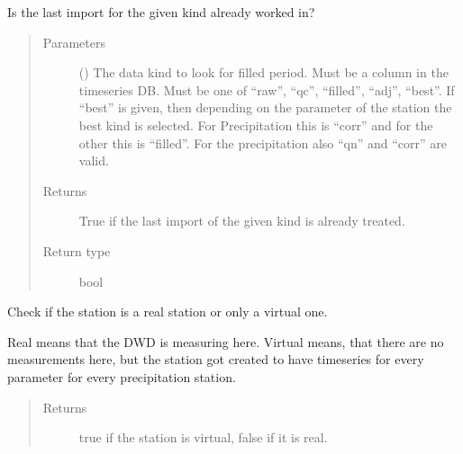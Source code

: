 \documentclass[letterpaper,10pt,english]{sphinxmanual}
\begin{document}
\begin{fulllineitems}
\begin{fulllineitems}
\label{\detokenize{weatherDB:weatherDB.station.StationBase.is_last_imp_done}}
\sphinxAtStartPar
Is the last import for the given kind already worked in?
\begin{quote}\begin{description}
\item[{Parameters}] \leavevmode
\sphinxAtStartPar
{} () \textendash{} The data kind to look for filled period.
Must be a column in the timeseries DB.
Must be one of “raw”, “qc”, “filled”, “adj”, “best”.
If “best” is given, then depending on the parameter of the station the best kind is selected.
For Precipitation this is “corr” and for the other this is “filled”.
For the precipitation also “qn” and “corr” are valid.

\item[{Returns}] \leavevmode
\sphinxAtStartPar
True if the last import of the given kind is already treated.

\item[{Return type}] \leavevmode
\sphinxAtStartPar
bool

\end{description}\end{quote}

\end{fulllineitems}


\begin{fulllineitems}
\label{\detokenize{weatherDB:weatherDB.station.StationBase.is_virtual}}
\sphinxAtStartPar
Check if the station is a real station or only a virtual one.

\sphinxAtStartPar
Real means that the DWD is measuring here.
Virtual means, that there are no measurements here, but the station got created to have timeseries for every parameter for every precipitation station.
\begin{quote}\begin{description}
\item[{Returns}] \leavevmode
\sphinxAtStartPar
true if the station is virtual, false if it is real.


\end{description}
\end{quote}
\end{fulllineitems}
\end{fulllineitems}
\end{document}
